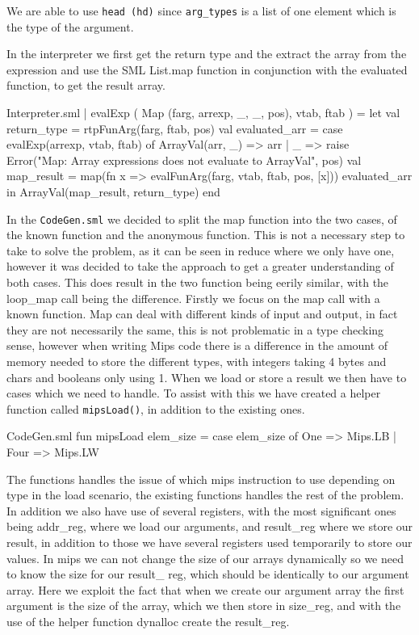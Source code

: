 \documentclass[11pt,a4paper,oneside]{report}
\begin{document}
We are able to use \texttt{head (hd)} since \texttt{arg\_types} is a list of one element which is the type of the argument.

In the interpreter we first get the return type and the extract the array from the expression and use the SML List.map function in conjunction with the evaluated function, to get the result array.

\begin{code}[firstnumber=294]{Interpreter.sml}
  | evalExp ( Map (farg, arrexp, _, _, pos), vtab, ftab ) =
    let
      val return_type = rtpFunArg(farg, ftab, pos)
      val evaluated_arr = case evalExp(arrexp, vtab, ftab) of
        ArrayVal(arr, _) => arr
        | _ => raise Error("Map: Array expressions does not evaluate to ArrayVal", pos)
      val map_result = map(fn x => evalFunArg(farg, vtab, ftab, pos, [x])) evaluated_arr
    in
      ArrayVal(map_result, return_type)
    end
\end{code}

In the \texttt{CodeGen.sml} we decided to split the map function into the two cases, of the known function and the anonymous function. This is not a necessary step to take to solve the problem, as it can be seen in reduce where we only have one, however it was decided to take the approach to get a greater understanding of both cases. This does result in the two function being eerily similar, with the loop\_map call being the difference.
Firstly we focus on the map call with a known function. Map can deal with different kinds of input and output, in fact they are not necessarily the same, this is not problematic in a type checking sense, however when writing Mips code there is a difference in the amount of memory needed to store the different types, with integers taking 4 bytes and chars and booleans only using 1. When we load or store a result we then have to cases which we need to handle. To assist with this we have created a helper function called \texttt{mipsLoad()}, in addition to the existing ones.
\begin{code}[firstnumber=81]{CodeGen.sml}
fun mipsLoad elem_size = case elem_size of
                              One => Mips.LB
                            | Four => Mips.LW
\end{code}
The functions handles the issue of which mips instruction to use depending on type in the load scenario, the existing functions handles the rest of the problem.
In addition we also have use of several registers, with the most significant ones being addr\_reg, where we load our arguments, and result\_reg where we store our result, in addition to those we have several registers used temporarily to store our values. In mips we can not change the size of our arrays dynamically so we need to know the size for our result\_ reg, which should be identically to our argument array. Here we exploit the fact that when we create our argument array the first argument is the size of the array, which we then store in size\_reg, and with the use of the helper function dynalloc create the result\_reg.
\end{document}
